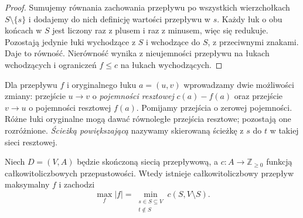 \begin{proof}
Sumujemy równania zachowania przepływu po wszystkich
wierzchołkach $S\setminus\{s\}$ i dodajemy do nich
definicję wartości przepływu w $s$. Każdy łuk o obu końcach
w $S$ jest liczony raz z plusem i raz z minusem, więc się
redukuje. Pozostają jedynie łuki wychodzące z $S$
i wchodzące do $S$, z przeciwnymi znakami. Daje to równość.
Nierówność wynika z nieujemności przepływu na łukach
wchodzących i ograniczeń $f\le c$ na łukach wychodzących.
\end{proof}

\begin{definicja}
Dla przepływu $f$ i oryginalnego łuku $a=(u,v)$
wprowadzamy dwie możliwości zmiany: przejście $u\to v$
o \emph{pojemności resztowej} $c(a)-f(a)$ oraz przejście
$v\to u$ o pojemności resztowej $f(a)$. Pomijamy
przejścia o zerowej pojemności. Różne łuki oryginalne
mogą dawać równoległe przejścia resztowe; pozostają one
rozróżnione. \emph{Ścieżką powiększającą} nazywamy
skierowaną ścieżkę z $s$ do $t$ w takiej sieci resztowej.
\end{definicja}

\begin{twierdzenie}
\label{thm:tg-maxflow}
Niech $D=(V,A)$ będzie skończoną siecią przepływową,
a $c:A\to\mathbb Z_{\ge0}$ funkcją całkowitoliczbowych
przepustowości. Wtedy istnieje całkowitoliczbowy przepływ
maksymalny $f$ i zachodzi
\[
\max_f |f|=\min_{\substack{s\in S\subseteq V\\t\notin S}}
 c(S,V\setminus S).
\]
\end{twierdzenie}

